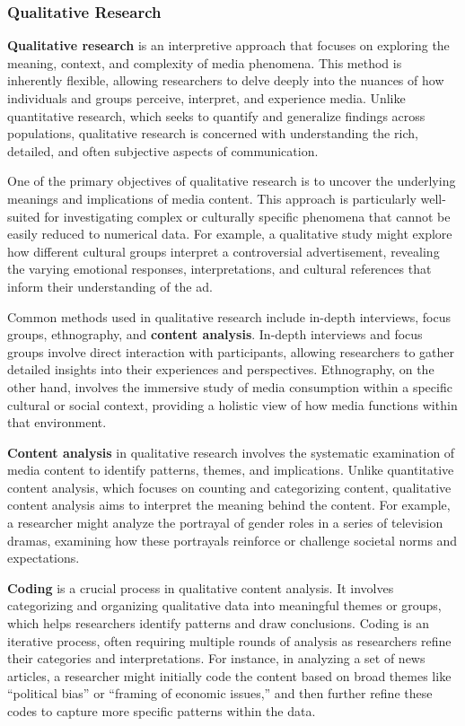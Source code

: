 \documentclass[
]{book}
\begin{document}
\subsubsection*{Qualitative Research}\label{qualitative-research}

\textbf{Qualitative research} is an interpretive approach that focuses on exploring the meaning, context, and complexity of media phenomena. This method is inherently flexible, allowing researchers to delve deeply into the nuances of how individuals and groups perceive, interpret, and experience media. Unlike quantitative research, which seeks to quantify and generalize findings across populations, qualitative research is concerned with understanding the rich, detailed, and often subjective aspects of communication.

One of the primary objectives of qualitative research is to uncover the underlying meanings and implications of media content. This approach is particularly well-suited for investigating complex or culturally specific phenomena that cannot be easily reduced to numerical data. For example, a qualitative study might explore how different cultural groups interpret a controversial advertisement, revealing the varying emotional responses, interpretations, and cultural references that inform their understanding of the ad.

Common methods used in qualitative research include in-depth interviews, focus groups, ethnography, and \textbf{content analysis}. In-depth interviews and focus groups involve direct interaction with participants, allowing researchers to gather detailed insights into their experiences and perspectives. Ethnography, on the other hand, involves the immersive study of media consumption within a specific cultural or social context, providing a holistic view of how media functions within that environment.

\textbf{Content analysis} in qualitative research involves the systematic examination of media content to identify patterns, themes, and implications. Unlike quantitative content analysis, which focuses on counting and categorizing content, qualitative content analysis aims to interpret the meaning behind the content. For example, a researcher might analyze the portrayal of gender roles in a series of television dramas, examining how these portrayals reinforce or challenge societal norms and expectations.

\textbf{Coding} is a crucial process in qualitative content analysis. It involves categorizing and organizing qualitative data into meaningful themes or groups, which helps researchers identify patterns and draw conclusions. Coding is an iterative process, often requiring multiple rounds of analysis as researchers refine their categories and interpretations. For instance, in analyzing a set of news articles, a researcher might initially code the content based on broad themes like ``political bias'' or ``framing of economic issues,'' and then further refine these codes to capture more specific patterns within the data.
\end{document}
